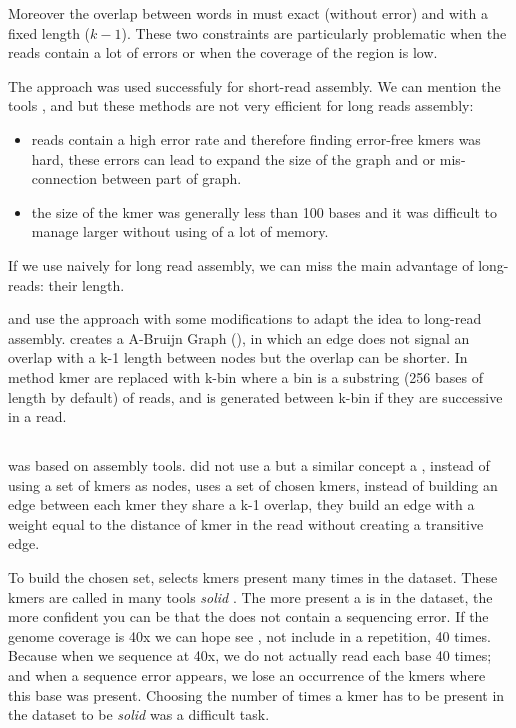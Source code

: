 \documentclass[main]{subfiles}
\begin{document}
Moreover the overlap between words in \DBG must exact (without error) and with a fixed length ($k - 1$). These two constraints are particularly problematic when the reads contain a lot of errors or when the coverage of the region is low.

The \DBG approach was used successfuly for short-read assembly. We can mention the tools  \cite{spades},  \cite{minia} and \cite{megahit} but these methods are not very efficient for long reads assembly:
\begin{itemize}
    \item reads contain a high error rate and therefore finding error-free kmers was hard, these errors can lead to expand the size of the graph and or mis-connection between part of graph.
    \item the size of the kmer was generally less than 100 bases and it was difficult to manage larger without using of a lot of memory.
\end{itemize}

If we use \DBG naively for long read assembly, we can miss the main advantage of long-reads: their length.

\flye and \wtdbg use the \DBG approach with some modifications to adapt the idea to long-read assembly. \flye creates a A-Bruijn Graph (), in which an edge does not signal an overlap with a k-1 length between nodes but the overlap can be shorter. In \wtdbg method kmer are replaced with k-bin where a bin is a substring (256 bases of length by default) of reads, and is generated between k-bin if they are successive in a read.

\subsection{\flye}

\flye\cite{Flye} was based on \abruijn\cite{abruijn} assembly tools. \abruijn did not use a \DBG but a similar concept a , instead of using a set of kmers as nodes,  uses a set of chosen kmers, instead of building an edge between each kmer they share a k-1 overlap, they build an edge with a weight equal to the distance of kmer in the read without creating a transitive edge.

To build the chosen \kmers set, \abruijn selects kmers present many times in the dataset. These kmers are called in many tools \textit{solid} \kmers {} . The more present a \kmer is in the dataset, the more confident you can be that the \kmer does not contain a sequencing error. If the genome coverage is 40x we can hope see \kmer, not include in a repetition, 40 times. Because when we sequence at 40x, we do not actually read each base 40 times; and when a sequence error appears, we lose an occurrence of the kmers where this base was present. Choosing the number of times a kmer has to be present in the dataset to be \textit{solid} was a difficult task.
\end{document}
